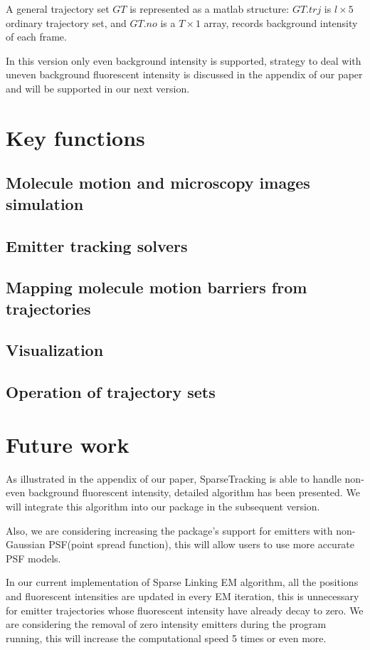 \documentclass[a4paper]{article}
\begin{document}
\begin{CJK*}{UTF8}{kai}
A general trajectory set $GT$ is represented as a matlab structure: $GT.trj$ is $l\times 5$ ordinary trajectory set, and $GT.no$ is a $T\times 1$ array, records background intensity of each frame.

In this version only even background intensity is supported, strategy to deal with uneven background fluorescent intensity is discussed in the appendix of our paper and will be supported in our next version.

\section{Key functions}
\subsection{Molecule motion and microscopy images simulation}

\subsection{Emitter tracking solvers}

\subsection{Mapping molecule motion barriers from trajectories}

\subsection{Visualization}

\subsection{Operation of trajectory sets}


\section{Future work}

As illustrated in the appendix of our paper, SparseTracking is able to handle non-even background fluorescent intensity, detailed algorithm has been presented. We will integrate this algorithm into our package in the subsequent version.

Also, we are considering increasing the package's support for emitters with non-Gaussian PSF(point spread function), this will allow users to use more accurate PSF models.

In our current implementation of Sparse Linking EM algorithm, all the positions and fluorescent intensities are updated in every EM iteration, this is unnecessary for emitter trajectories whose fluorescent intensity have already decay to zero. We are considering the removal of zero intensity emitters during the program running, this will increase the computational speed 5 times or even more.

\end{CJK*}
\end{document}

